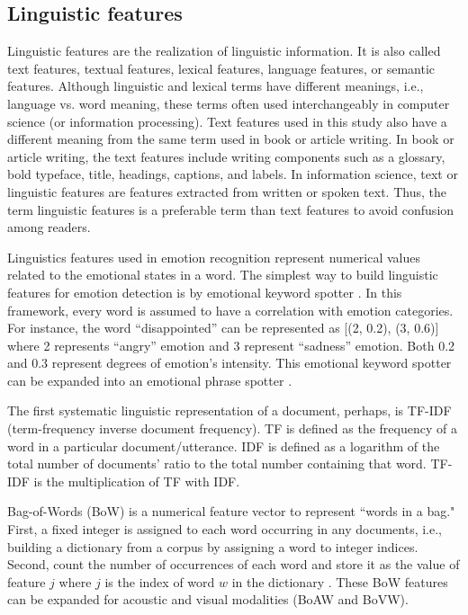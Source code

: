 \subsection{Linguistic features}
Linguistic features are the realization of linguistic information. It is also
called text features, textual features, lexical features, language features, or
semantic features. Although linguistic and lexical terms have different
meanings, i.e., language vs. word meaning,  these terms often used
interchangeably in computer science (or information processing). Text features
used in this study also have a different meaning from the same term used in
book or article writing. In book or article writing, the text features include
writing components such as a glossary, bold typeface, title, headings,
captions, and labels. In information science, text or linguistic features are
features extracted from written or spoken text.  Thus, the term linguistic
features is a preferable term than text features to avoid confusion among
readers.

Linguistics features used in emotion recognition represent numerical values
related to the emotional states in a word. The simplest way to build linguistic
features for emotion detection is by emotional keyword spotter
\cite{Chuang2004}. In this framework, every word is assumed to have a
correlation with emotion categories. For instance, the word ``disappointed''
can be represented as [(2, 0.2), (3, 0.6)] where 2 represents ``angry'' emotion
and 3 represent ``sadness'' emotion. Both 0.2 and 0.3 represent degrees of
emotion's intensity. This emotional keyword spotter can be expanded into an
emotional phrase spotter \cite{Schuller2004}.

The first systematic linguistic representation of a document, perhaps, is
TF-IDF (term-frequency inverse document frequency). TF is defined as the
frequency of a word in a particular document/utterance. IDF is defined as a
logarithm of the total number of documents' ratio to the total number
containing that word. TF-IDF is the multiplication of TF with IDF.

Bag-of-Words (BoW) is a numerical feature vector to represent ``words in a bag."
First, a fixed integer is assigned to each word occurring in any documents,
i.e., building a dictionary from a corpus by assigning a word to integer
indices.  Second, count the number of occurrences of each word and store it as
the value of feature $j$ where $j$ is the index of word $w$ in the dictionary
\cite{scikit-learn}.  These BoW features can be expanded for acoustic and
visual modalities (BoAW and BoVW).

